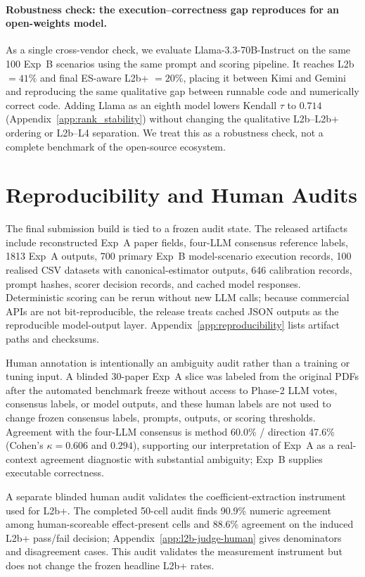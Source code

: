 \documentclass{article}
\begin{document}
\paragraph{Robustness check: the execution--correctness gap reproduces for an open-weights model.}
As a single cross-vendor check, we evaluate Llama-3.3-70B-Instruct on the
same 100 Exp~B scenarios using the same prompt and scoring pipeline. It
reaches L2b $=41\%$ and final ES-aware L2b+ $=20\%$, placing it between
Kimi and Gemini and reproducing the same qualitative gap between runnable
code and numerically correct code. Adding Llama as an eighth model
lowers Kendall $\tau$ to $0.714$ (Appendix~\ref{app:rank_stability})
without changing the qualitative L2b--L2b+ ordering or L2b--L4
separation. We treat this as a robustness check, not a complete
benchmark of the open-source ecosystem.

\section{Reproducibility and Human Audits}

The final submission build is tied to a frozen audit state. The released
artifacts include reconstructed Exp~A paper fields, four-LLM consensus
reference labels, 1813 Exp~A outputs, 700 primary Exp~B model-scenario
execution records, 100 realised CSV datasets with canonical-estimator
outputs, 646 calibration records, prompt hashes, scorer decision records,
and cached model responses. Deterministic scoring can be rerun without
new LLM calls; because commercial APIs are not bit-reproducible, the
release treats cached JSON outputs as the reproducible model-output layer.
Appendix~\ref{app:reproducibility} lists artifact paths and checksums.

Human annotation is intentionally an ambiguity audit rather than a
training or tuning input. A blinded 30-paper Exp~A slice was labeled
from the original PDFs after the automated benchmark freeze without
access to Phase-2 LLM votes, consensus labels, or model outputs, and
these human labels are not used to change frozen consensus labels,
prompts, outputs, or scoring thresholds. Agreement with the four-LLM
consensus is method 60.0\% / direction 47.6\% (Cohen's
$\kappa = 0.606$ and $0.294$), supporting our interpretation of Exp~A
as a real-context agreement diagnostic with substantial ambiguity;
Exp~B supplies executable correctness.

A separate blinded human audit validates the coefficient-extraction
instrument used for L2b+. The completed 50-cell audit finds 90.9\%
numeric agreement among human-scoreable effect-present cells and 88.6\%
agreement on the induced L2b+ pass/fail decision; Appendix~\ref{app:l2b-judge-human}
gives denominators and disagreement cases. This audit validates the
measurement instrument but does not change the frozen headline L2b+
rates.
\end{document}
